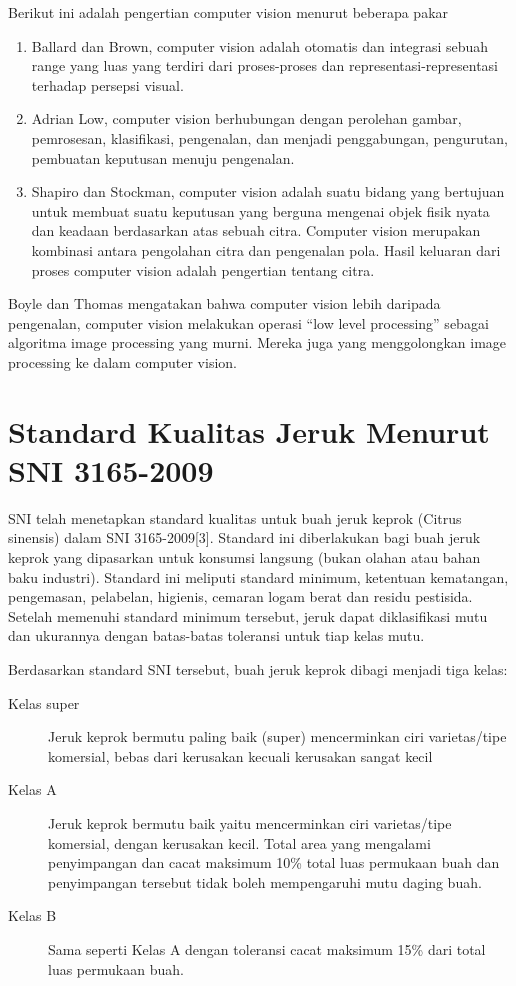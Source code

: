\documentclass[laporan.tex]{subfiles}
\begin{document}
Berikut ini adalah pengertian computer vision menurut beberapa pakar

\begin{enumerate}
\item Ballard dan Brown, computer vision adalah otomatis dan integrasi sebuah range yang luas yang terdiri dari proses-proses dan representasi-representasi terhadap persepsi visual.
\item Adrian Low, computer vision berhubungan dengan perolehan gambar, pemrosesan, klasifikasi, pengenalan, dan menjadi penggabungan, pengurutan, pembuatan keputusan menuju pengenalan.
\item Shapiro dan Stockman, computer vision adalah suatu bidang yang bertujuan untuk membuat suatu keputusan yang berguna mengenai objek fisik nyata dan keadaan berdasarkan atas sebuah citra. Computer vision merupakan kombinasi antara pengolahan citra dan pengenalan pola. Hasil keluaran dari proses computer vision adalah pengertian tentang citra.
\end{enumerate}

Boyle dan Thomas mengatakan bahwa computer vision lebih daripada pengenalan, computer vision melakukan operasi “low level processing” sebagai algoritma image processing yang murni. Mereka juga yang menggolongkan image processing ke dalam computer vision.

\section{Standard Kualitas Jeruk Menurut SNI 3165-2009}

SNI telah menetapkan standard kualitas untuk buah jeruk keprok (Citrus sinensis) dalam SNI 3165-2009[3]. Standard ini diberlakukan bagi buah jeruk keprok yang dipasarkan untuk konsumsi langsung (bukan olahan atau bahan baku industri). Standard ini meliputi standard minimum, ketentuan kematangan, pengemasan, pelabelan, higienis, cemaran logam berat dan residu pestisida. Setelah memenuhi standard minimum tersebut, jeruk dapat diklasifikasi mutu dan ukurannya dengan batas-batas toleransi untuk tiap kelas mutu.\cite{sni}

Berdasarkan standard SNI tersebut, buah jeruk keprok dibagi menjadi tiga kelas:

\begin{description}
\item [Kelas super] Jeruk keprok bermutu paling baik (super) mencerminkan ciri varietas/tipe komersial, bebas dari kerusakan kecuali kerusakan sangat kecil
\item [Kelas A] Jeruk keprok bermutu baik yaitu mencerminkan ciri varietas/tipe komersial, dengan kerusakan kecil. Total area yang mengalami penyimpangan dan cacat maksimum 10\% total luas permukaan buah dan penyimpangan tersebut tidak boleh mempengaruhi mutu daging buah.
\item [Kelas B] Sama seperti Kelas A dengan toleransi cacat maksimum 15\% dari total luas permukaan buah.
\end{description}
\end{document}
